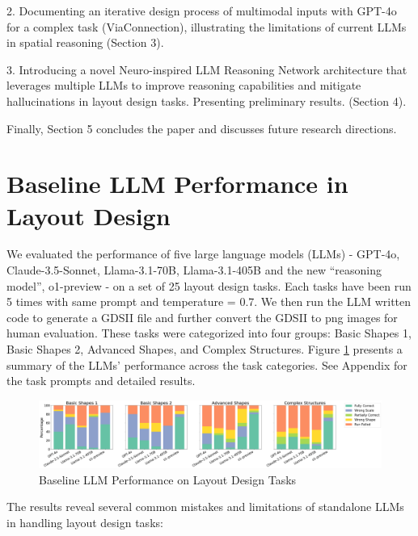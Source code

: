 \documentclass{article}
\begin{document}
2. Documenting an iterative design process of multimodal inputs with GPT-4o for a complex task (ViaConnection), illustrating the limitations of current LLMs in spatial reasoning (Section 3).

3. Introducing a novel Neuro-inspired LLM Reasoning Network architecture that leverages multiple LLMs to improve reasoning capabilities and mitigate hallucinations in layout design tasks. Presenting preliminary results. (Section 4).

Finally, Section 5 concludes the paper and discusses future research directions.

\section{Baseline LLM Performance in Layout Design}

We evaluated the performance of five large language models (LLMs) - GPT-4o, Claude-3.5-Sonnet, Llama-3.1-70B, Llama-3.1-405B and the new ``reasoning model'', o1-preview - on a set of 25 layout design tasks. Each tasks have been run 5 times with same prompt and temperature = 0.7. We then run the LLM written code to generate a GDSII file and further convert the GDSII to png images for human evaluation. These tasks were categorized into four groups: Basic Shapes 1, Basic Shapes 2, Advanced Shapes, and Complex Structures. Figure \ref{fig:baseline-llm-performance} presents a summary of the LLMs' performance across the task categories. See Appendix for the task prompts and detailed results.

\begin{figure}[h]
  \centering
  \includegraphics[width=\textwidth]{baseline-llm-performance.png}
  \caption{Baseline LLM Performance on Layout Design Tasks}
  \label{fig:baseline-llm-performance}
\end{figure}

The results reveal several common mistakes and limitations of standalone LLMs in handling layout design tasks:
\end{document}
